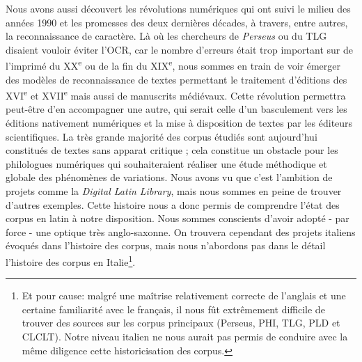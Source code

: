 Nous avons aussi découvert les révolutions numériques qui ont suivi le milieu des années 1990 et les promesses des deux dernières décades, à travers, entre autres, la reconnaissance de caractère. Là où les chercheurs de \textit{Perseus} ou du TLG disaient vouloir éviter l'OCR, car le nombre d'erreurs était trop important sur de l'imprimé du XX\textsuperscript{e} ou de la fin du XIX\textsuperscript{e}, nous sommes en train de voir émerger des modèles de reconnaissance de textes permettant le traitement d'éditions des XVI\textsuperscript{e} et XVII\textsuperscript{e} mais aussi de manuscrits médiévaux. Cette révolution permettra peut-être d'en accompagner une autre, qui serait celle d'un basculement vers les éditions nativement numériques et la mise à disposition de textes par les éditeurs scientifiques. La très grande majorité des corpus étudiés sont aujourd'hui constitués de textes sans apparat critique ; cela constitue un obstacle pour les philologues numériques qui souhaiteraient réaliser une étude méthodique et globale des phénomènes de variations. Nous avons vu que c'est l'ambition de projets comme la \textit{Digital Latin Library}, mais nous sommes en peine de trouver d'autres exemples. Cette histoire nous a donc permis de comprendre l'état des corpus en latin à notre disposition. Nous sommes conscients d'avoir adopté - par force - une optique très anglo-saxonne. On trouvera cependant des projets italiens évoqués dans l'histoire des corpus, mais nous n'abordons pas dans le détail l'histoire des corpus en Italie\footnote{Et pour cause: malgré une maîtrise relativement correcte de l'anglais et une certaine familiarité avec le français, il nous fût extrêmement difficile de trouver des sources sur les corpus principaux (Perseus, PHI, TLG, PLD et CLCLT). Notre niveau italien ne nous aurait pas permis de conduire avec la même diligence cette historicisation des corpus.}.

